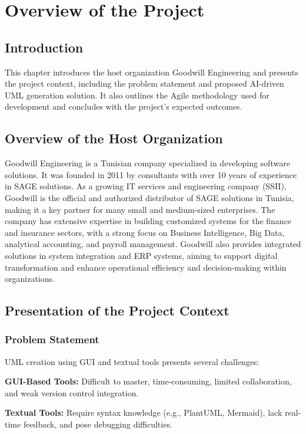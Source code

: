 \chapter[Overview]{Overview of the Project}

\section{Introduction}

This chapter introduces the host organization Goodwill Engineering and presents the project context, including the problem statement and proposed AI-driven UML generation solution.
It also outlines the Agile methodology used for development and concludes with the project's expected outcomes.
\section{Overview of the Host Organization}
Goodwill Engineering is a Tunisian company specialized in developing software solutions. It was founded in 2011 by consultants with over 10 years of experience in SAGE solutions. As a growing IT services and engineering company (SSII), Goodwill is the official and authorized distributor of SAGE solutions in Tunisia, making it a key partner for many small and medium-sized enterprises. The company has extensive expertise in building customized systems for the finance and insurance sectors, with a strong focus on Business Intelligence, Big Data, analytical accounting, and payroll management. Goodwill also provides integrated solutions in system integration and ERP systems, aiming to support digital transformation and enhance operational efficiency and decision-making within organizations.
\section{Presentation of the Project Context}

\subsection{Problem Statement}

UML creation using GUI and textual tools presents several challenges:

\textbf{GUI-Based Tools:} Difficult to master, time-consuming, limited collaboration, and weak version control integration.

\textbf{Textual Tools:} Require syntax knowledge (e.g., PlantUML, Mermaid), lack real-time feedback, and pose debugging difficulties.

